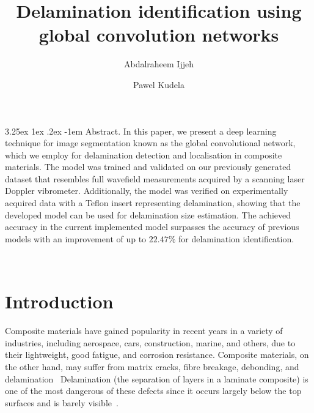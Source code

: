 \documentclass[runningheads]{llncs}
\makeatletter
\renewcommand\paragraph{\@startsection{paragraph}{4}{\z@}%
                                    {3.25ex \@plus1ex \@minus.2ex}%
                                    {-1em}%
                                    {\normalfont\normalsize\bfseries}}
\makeatother
\begin{document}
%
\title{Delamination identification using global convolution networks}
%
%
\author{Abdalraheem Ijjeh \and
Pawel Kudela}
%
%
%
\maketitle              %
%
\paragraph{Abstract.}
In this paper, we present a deep learning technique for image segmentation known as the global convolutional network, which we employ for delamination detection and localisation in composite materials.
The model was trained and validated on our previously generated dataset that resembles full wavefield measurements acquired by a scanning laser Doppler vibrometer.
Additionally, the model was verified on experimentally acquired data with a Teflon insert representing delamination, showing that the developed model can be used for delamination size estimation.
The achieved accuracy in the current implemented model surpasses the accuracy of previous models with an improvement of up to $22.47\%$ for delamination identification.


%
\\[2em]

\section{Introduction}
Composite materials have gained popularity in recent years in a variety of industries, including aerospace, cars, construction, marine, and others, due to their lightweight, good fatigue, and corrosion resistance.
Composite materials, on the other hand, may suffer from matrix cracks, fibre breakage, debonding, and delamination~\cite{ip2004delamination, smith2009composite}
Delamination (the separation of layers in a laminate composite) is one of the most dangerous of these defects since it occurs largely below the top surfaces and is barely visible~\cite{Cai2012}.
\end{document}
